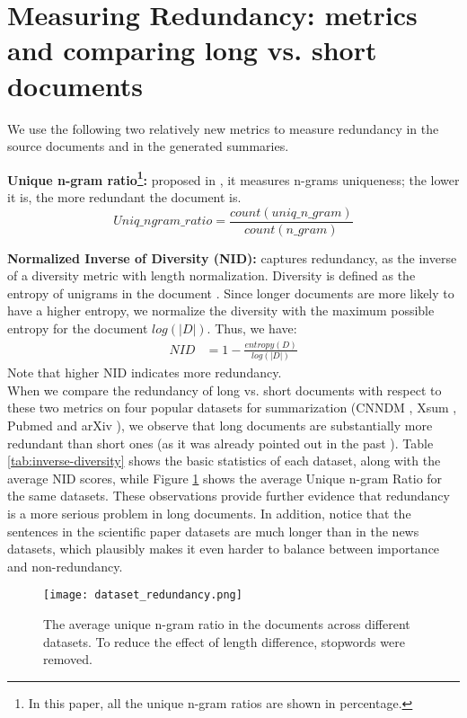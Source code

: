 \documentclass[11pt,a4paper]{article}
\begin{document}
\section{Measuring Redundancy: metrics and comparing long vs. short documents}
\label{sec-measure-red}
We use the following two relatively new metrics to measure redundancy in the source documents and in the generated summaries.

\textbf{Unique n-gram ratio\footnote{In this paper, all the unique n-gram ratios are shown in percentage.}:} proposed in , it measures n-grams uniqueness; the lower it is, the more redundant the document is.  $$Uniq\_ngram\_ratio = \frac{count(uniq\_n\_gram)}{count(n\_gram)}$$

\textbf{Normalized Inverse of Diversity (NID):} captures redundancy, as the inverse of a diversity metric with length normalization. Diversity is defined as the entropy of unigrams in the document \cite{nid_score}.
Since longer documents are more likely to have a higher entropy, we normalize the diversity with the maximum possible entropy for the document $log(|D|)$. Thus, we have:
\begin{align*}
  NID &= 1-\frac{entropy(D)}{log(|D|)}
    \end{align*}
Note that higher NID indicates more redundancy. \\

When we compare the redundancy of long vs. short documents with respect to these two metrics  on four popular datasets for summarization (CNNDM \cite{nallapati-etal-2016-abstractive}, Xsum \cite{narayan-etal-2018-dont}, Pubmed and arXiv \cite{discourse-aware}), we observe that long documents are substantially more redundant than short ones (as it was already pointed out in the past \cite{longdoc_more_redundancy}).    Table \ref{tab:inverse-diversity} shows the basic statistics of each dataset, along with the average NID scores, while
Figure \ref{fig:n-gram} shows the average Unique n-gram Ratio for the same datasets. These observations provide further evidence that redundancy is a more serious problem in long documents. In addition, notice that the sentences in the scientific paper datasets are much longer than in the news datasets, which plausibly makes it even harder to balance between importance and non-redundancy.

\begin{figure}
    \centering
\texttt{[image: dataset\_redundancy.png]}
    \caption{The average unique n-gram ratio in the documents across different datasets. To reduce the effect of length difference, stopwords were removed.}
    \label{fig:n-gram}
    \vspace{-4mm}
\end{figure}
\end{document}
